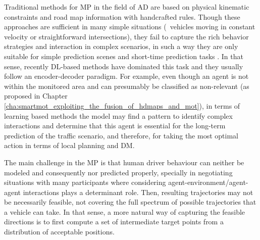 Traditional methods for \ac{MP} in the field of \ac{AD} are based on physical kinematic constraints and road map information with handcrafted rules. Though these approaches are sufficient in many simple situations (\ie \ vehicles moving in constant velocity or straightforward intersections), they fail to capture the rich behavior strategies and interaction in complex scenarios, in such a way they are only suitable for simple prediction scenes and short-time prediction tasks \cite{huang2022survey}. In that sense, recently \ac{DL}-based methods have dominated this task and they usually follow an encoder-decoder paradigm. For example, even though an agent is not within the monitored area and can presumably be classified as non-relevant (as proposed in Chapter \ref{cha:smartmot_exploiting_the_fusion_of_hdmaps_and_mot}), in terms of learning based methods the model may find a pattern to identify complex interactions and determine that this agent is essential for the long-term prediction of the traffic scenario, and therefore, for taking the most optimal action in terms of local planning and \acf{DM}.

The main challenge in the \ac{MP} is that human driver behaviour can neither be modeled and consequently nor predicted properly, specially in negotiating situations \cite{gomez2021train} \cite{mercat2020multi} with many participants where considering agent-environment/agent-agent interactions \cite{sadeghian2019sophie} plays a determinant role. Then, resulting trajectories may not be necessarily feasible, not covering the full spectrum of possible trajectories that a vehicle can take. In that sense, a more natural way of capturing the feasible directions \cite{dendorfer2020goal} is to first compute a set of intermediate target points from a distribution of acceptable positions. 

